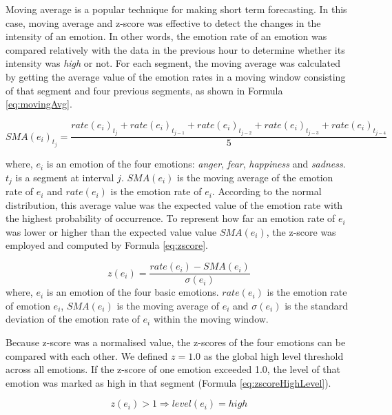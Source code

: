Moving average is a popular technique for making short term forecasting. In this case, moving average and z-score was effective to detect the changes in the intensity of an emotion. In other words, the emotion rate of an emotion was compared relatively with the data in the previous hour to determine whether its intensity was \textit{high} or not. For each segment, the moving average was calculated by getting the average value of the emotion rates in a moving window consisting of that segment and four previous segments, as shown in Formula \ref{eq:movingAvg}.

\begin{equation}
\label{eq:movingAvg}
	SMA(e_i)_{t_j} = \frac{ rate(e_i)_{t_j} + rate(e_i)_{t_{j-1}} + rate(e_i)_{t_{j-2}} + rate(e_i)_{t_{j-3}} + rate(e_i)_{t_{j-4}} }{5}
\end{equation} 

where, \(e_i\) is an emotion of the four emotions: \textit{anger}, \textit{fear}, \textit{happiness} and \textit{sadness}. \(t_j\) is a segment at interval \(j\). \(SMA(e_i)\) is the moving average of the emotion rate of \(e_i\) and \(rate(e_i)\) is the emotion rate of \(e_i\). According to the normal distribution, this average value was the expected value of the emotion rate with the highest probability of occurrence. To represent how far an emotion rate of \(e_i\) was lower or higher than the expected value value \(SMA(e_i)\), the z-score was employed and computed by Formula \ref{eq:zscore}.

\begin{equation}
\label{eq:zscore}
	z(e_i) = \frac{rate(e_i) - SMA(e_i)}{\sigma(e_i)}
\end{equation}
where, \(e_i\) is an emotion of the four basic emotions. \(rate(e_i)\) is the emotion rate of emotion \(e_i\), \(SMA(e_i)\) is the moving average of \(e_i\) and \(\sigma(e_i)\) is the standard deviation of the emotion rate of \(e_i\) within the moving window. 

Because z-score was a normalised value, the z-scores of the four emotions can be compared with each other. We defined \(z = 1.0\) as the global high level threshold across all emotions. If the z-score of one emotion exceeded 1.0, the level of that emotion was marked as high in that segment (Formula \ref{eq:zscoreHighLevel}).

\begin{equation}
\label{eq:zscoreHighLevel}
	z(e_i) > 1 \Rightarrow level(e_i) = high
\end{equation} 

